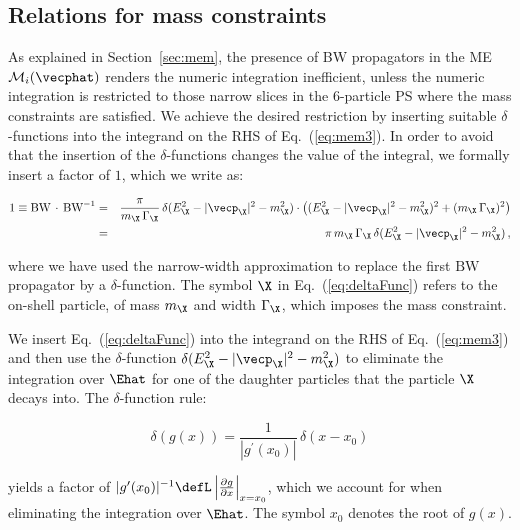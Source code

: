 \subsection{Relations for mass constraints}
\label{sec:appendix_mass_constraints}

As explained in Section~\ref{sec:mem},
the presence of BW propagators in the ME $\mathcal{M}_{i}(\vecphat)$ renders the numeric integration inefficient,
unless the numeric integration is restricted to those narrow slices in the $6$-particle PS where the mass constraints are satisfied.
We achieve the desired restriction by inserting suitable $\delta$-functions into the integrand on the RHS of Eq.~(\ref{eq:mem3}).
In order to avoid that the insertion of the $\delta$-functions changes the value of the integral,
we formally insert a factor of $1$, which we write as:
\begin{linenowrapper}
\begin{eqnarray}
1 \equiv \textrm{BW} \, \cdot \, \textrm{BW}^{-1} 
 & = & \frac{\pi}{m_{\X} \, \Gamma_{\X}} \, \delta( E_{\X}^{2} - |\vecp_{\X}|^{2} - m_{\X}^{2} ) \cdot 
\left( (E_{\X}^{2} - |\vecp_{\X}|^{2} - m_{\X}^{2})^{2} + (m_{\X} \, \Gamma_{\X})^{2} \right) \nonumber \\
 & = & \pi \, m_{\X} \, \Gamma_{\X} \, \delta( E_{\X}^{2} - |\vecp_{\X}|^{2} - m_{\X}^{2} ) \, ,
\label{eq:deltaFunc}
\end{eqnarray}
\end{linenowrapper}
where we have used the narrow-width approximation to replace the first $\textrm{BW}$ propagator by a $\delta$-function.
The symbol $\X$ in Eq.~(\ref{eq:deltaFunc}) refers to the on-shell particle, of mass $m_{\X}$ and width $\Gamma_{\X}$, which imposes the mass constraint.

We insert Eq.~(\ref{eq:deltaFunc}) into the integrand on the RHS of Eq.~(\ref{eq:mem3})
and then use the $\delta$-function $\delta( E_{\X}^{2} - |\vecp_{\X}|^{2} - m_{\X}^{2} )$ 
to eliminate the integration over $\Ehat$ for one of the daughter particles that the particle $\X$ decays into.
The $\delta$-function rule:
\begin{linenowrapper}
\begin{equation} 
\delta\left( g(x) \right) = \frac{1}{|g^{\prime}(x_{0})|} \, \delta( x - x_{0} ) 
\label{eq:deltaFuncRule}
\end{equation}
\end{linenowrapper}
yields a factor of $|g^{\prime}(x_{0})|^{-1} \defL \left\lvert \frac{\partial g}{\partial x} \right\rvert_{x = x_{0}}$,
which we account for when eliminating the integration over $\Ehat$.
The symbol $x_{0}$ denotes the root of $g(x)$. 


